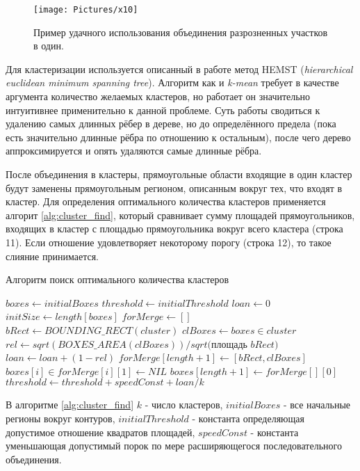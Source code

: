 \documentclass[12pt]{report}
\begin{document}
\begin{figure}[h]
	\centering
	\texttt{[image: Pictures/x10]}
	\caption{Пример удачного использования объединения разрозненных участков в один.}
	\label{fig:cluster_example}
\end{figure}

Для кластеризации используется описанный в работе \citep{grygorash2006minimum} метод HEMST (\textit{hierarchical 
euclidean minimum spanning tree}). Алгоритм как и \textit{k-mean} требует в качестве аргумента количество желаемых 
кластеров, но работает он значительно интуитивнее применительно к данной проблеме. Суть работы сводиться к удалению 
самых длинных рёбер в дереве, но до определённого предела (пока есть значительно длинные рёбра по отношению к 
остальным), после чего дерево аппроксимируется и опять удаляются самые длинные рёбра.

После объединения в кластеры, прямоугольные области входящие в один кластер будут заменены прямоугольным регионом, 
описанным вокруг тех, что входят в кластер. Для определения оптимального количества кластеров применяется алгорит \ref{alg:cluster_find}, который сравнивает сумму площадей прямоугольников, входящих в кластер с площадью прямоугольника вокруг 
всего кластера (строка 11). Если отношение удовлетворяет некоторому порогу (строка 12), то такое слияние 
принимается.

\begin{algorithm}[h]
\caption{Алгоритм поиск оптимального количества кластеров}
\label{alg:cluster_find}

\begin{algorithmic}[1]
\STATE $boxes \gets initialBoxes$
\STATE $threshold \gets initialThreshold$
\STATE $loan \gets 0$
\REPEAT
\STATE $initSize \gets length[boxes]$
\STATE $forMerge \gets []$
\STATE $bRect\gets BOUNDING\_RECT(cluster)$
\STATE $clBoxes\gets boxes \in cluster$
\STATE $rel\gets sqrt(BOXES\_AREA(clBoxes))/sqrt($площадь $bRect)$
\STATE $loan \gets loan + (1 - rel)$
\STATE $forMerge[length+1] \gets [bRect, clBoxes]$
\ENDIF
\ENDFOR
\STATE $boxes[i] \in forMerge[i][1] \gets NIL$
\STATE $boxes[length+1] \gets forMerge[][0]$
\STATE $threshold \gets threshold + speedConst + loan/k$
\ENDFOR
{}
\end{algorithmic}

\end{algorithm}
В алгоритме \ref{alg:cluster_find} $k$ - число кластеров, $initialBoxes$ - все начальные регионы вокруг контуров, $initialThreshold$ - константа 
определяющая допустимое отношение квадратов площадей, $speedConst$ - константа уменьшающая допустимый порок по мере 
расширяющегося последовательного объединения. 
\end{document}
